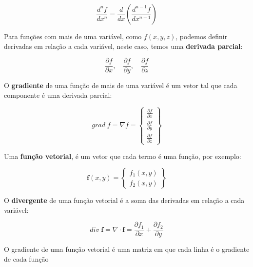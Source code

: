         \begin{equation*}
            \frac{d^nf}{dx^n} = \frac{d}{dx} \left(\frac{d^{n-1}f}{dx^{n-1}}\right)
        \end{equation*}

        Para funções com mais de uma variável, como $f(x,y,z)$, podemos definir derivadas em relação a cada variável, neste caso, temos uma \textbf{derivada parcial}:

        \begin{equation*}
            \frac{\partial f}{\partial x}, \quad \frac{\partial f}{\partial y}, \quad \frac{\partial f}{\partial z}
        \end{equation*}

        O \textbf{gradiente} de uma função de mais de uma variável é um vetor tal que cada componente é uma derivada parcial:

        \begin{equation*}
            grad \; f = \nabla f = 
            \begin{Bmatrix}
                \frac{\partial f}{\partial x}\\
                \frac{\partial f}{\partial y}\\
                \frac{\partial f}{\partial z}
            \end{Bmatrix}
        \end{equation*}

        Uma \textbf{função vetorial}, é um vetor que cada termo é uma função, por exemplo:

        \begin{equation*}
            \mathbf{f}(x,y) = 
            \begin{Bmatrix}
                f_1(x,y)\\
                f_2(x,y)
            \end{Bmatrix}
        \end{equation*}

        O \textbf{divergente} de uma função vetorial é a soma das derivadas em relação a cada variável:

        \begin{equation*}
            div \; \mathbf{f} = 
            \nabla \cdot \mathbf{f} = 
            \frac{\partial f_1}{\partial x} + \frac{\partial f_2}{\partial y}
        \end{equation*}

        O gradiente de uma função vetorial é uma matriz em que cada linha é o gradiente de cada função

